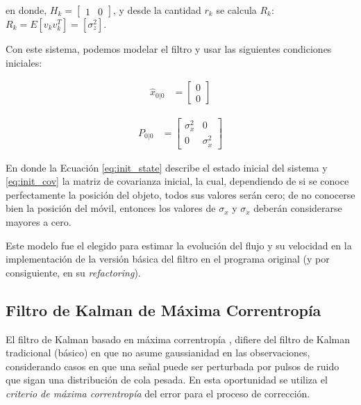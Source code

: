 en donde, $H_k = \begin{bmatrix}
1 & 0
\end{bmatrix}$, y desde la cantidad $r_k$ se calcula $R_k$: $R_k = E[v_kv_k^T]=[\sigma_{z}^2]$.

Con este sistema, podemos modelar el filtro y usar las siguientes condiciones iniciales:

\begin{align}
\hat{x}_{0|0} &= \begin{bmatrix}
0\\
0
\end{bmatrix}
\label{eq:init_state} 
\end{align} 

\begin{align}
P_{0|0} &= \begin{bmatrix}
\sigma_{x}^2 & 0\\
0 & \sigma_{\dot{x}}^2
\end{bmatrix}
\label{eq:init_cov} 
\end{align} 

En donde la Ecuaci\'on \ref{eq:init_state} describe el estado inicial del sistema y \ref{eq:init_cov} la matriz de covarianza inicial, la cual, dependiendo de si se conoce perfectamente la posici\'on del objeto, todos sus valores ser\'an cero; de no conocerse bien la posici\'on del m\'ovil, entonces los valores de $\sigma_{x}$ y $\sigma_{\dot{x}}$ deber\'an considerarse mayores a cero.
\bigskip

Este modelo fue el elegido para estimar la evoluci\'on del flujo y su velocidad en la implementaci\'on de la versi\'on b\'asica del filtro en el programa original (y por consiguiente, en su \textit{refactoring}).



\subsection{Filtro de Kalman de M\'axima Correntrop\'ia}

El filtro de Kalman basado en m\'axima correntrop\'ia \cite{badong}, difiere del filtro de Kalman tradicional (b\'asico) en que no asume gaussianidad en las observaciones, considerando casos en que una se\~nal puede ser perturbada por pulsos de ruido que sigan una distribuci\'on de cola pesada. En esta oportunidad se utiliza el \textit{criterio de m\'axima correntrop\'ia} del error para el proceso de correcci\'on. 
\bigskip

